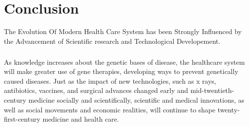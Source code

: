 \documentclass[12pt]{article}
\begin{document}
\section{Conclusion}
The Evolution Of Modern Health Care System has been Strongly Influenced by the Advancement of Scientific research and Technological Developement.\vspace{-5mm}
\subparagraph{ } As knowledge increases about the genetic bases of disease, the healthcare system will make greater use of gene therapies, developing ways to prevent genetically caused diseases. Just as the impact of new technologies, such as x rays, antibiotics, vaccines, and surgical advances changed early and mid-twentieth-century medicine socially and scientifically, scientific and medical innovations, as well as social movements and economic realities, will continue to shape twenty-first-century medicine and health care.
 
\end{document}
